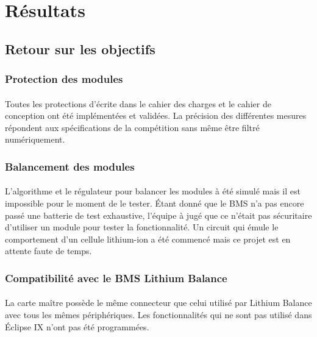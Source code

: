 \section{Résultats}

	\subsection{Retour sur les objectifs}
	
		\subsubsection{Protection des modules}
	
			\paragraph{}
			Toutes les protections d'écrite dans le cahier des charges et le cahier de conception ont été implémentées et validées. La précision des différentes mesures répondent aux spécifications de la compétition sans même être filtré numériquement.

		\subsubsection{Balancement des modules}

			\paragraph{}
			L'algorithme et le régulateur pour balancer les modules à été simulé mais il est impossible pour le moment de le tester. Étant donné que le BMS n'a pas encore passé une batterie de test exhaustive, l'équipe à jugé que ce n'était pas sécuritaire d'utiliser un module pour tester la fonctionnalité. Un circuit qui émule le comportement d'un cellule lithium-ion a été commencé mais ce projet est en attente faute de temps.
	
		\subsubsection{Compatibilité avec le BMS Lithium Balance}
	
			\paragraph{}
			La carte maître possède le même connecteur que celui utilisé par Lithium Balance avec tous les mêmes périphériques. Les fonctionnalités qui ne sont pas utilisé dans Éclipse IX n'ont pas été programmées.
		
